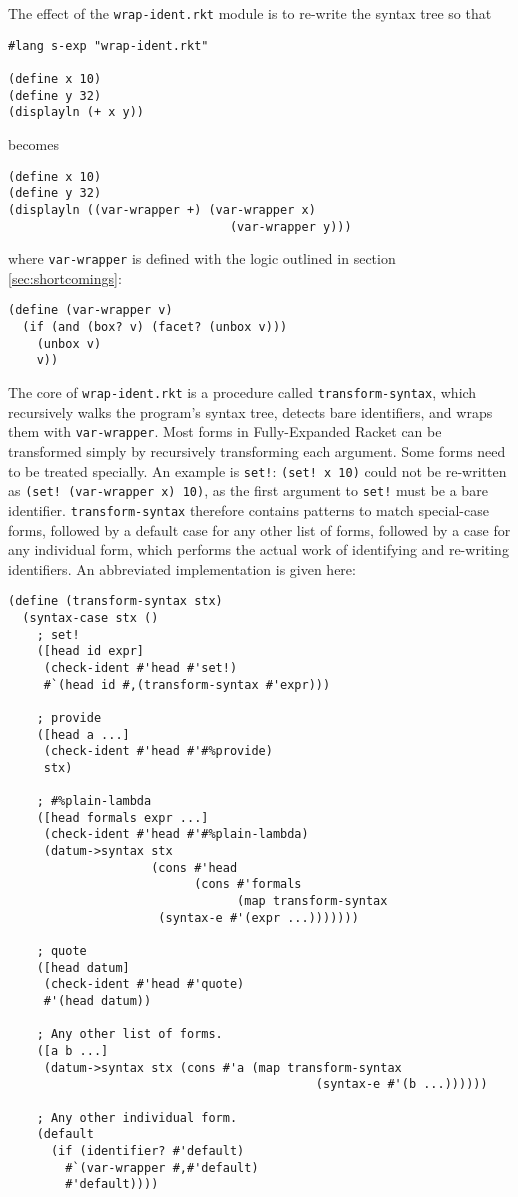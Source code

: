 \documentclass{article}
\begin{document}
The effect of the \texttt{wrap-ident.rkt} module is to re-write the syntax tree so that

\begin{lstlisting}
#lang s-exp "wrap-ident.rkt"

(define x 10)
(define y 32)
(displayln (+ x y))
\end{lstlisting}

\noindent becomes

\begin{lstlisting}
(define x 10)
(define y 32)
(displayln ((var-wrapper +) (var-wrapper x)
                               (var-wrapper y)))
\end{lstlisting}

\noindent where \texttt{var-wrapper} is defined with the logic outlined in section \ref{sec:shortcomings}:

\begin{lstlisting}
(define (var-wrapper v)
  (if (and (box? v) (facet? (unbox v)))
    (unbox v)
    v))
\end{lstlisting}

The core of \texttt{wrap-ident.rkt} is a procedure called \texttt{transform-syntax}, which recursively walks the program's syntax tree, detects bare identifiers, and wraps them with \texttt{var-wrapper}. Most forms in Fully-Expanded Racket can be transformed simply by recursively transforming each argument. Some forms need to be treated specially. An example is \texttt{set!}: \texttt{(set! x 10)} could not be re-written as \texttt{(set! (var-wrapper x) 10)}, as the first argument to \texttt{set!} must be a bare identifier. \texttt{transform-syntax} therefore contains patterns to match special-case forms, followed by a default case for any other list of forms, followed by a case for any individual form, which performs the actual work of identifying and re-writing identifiers. An abbreviated implementation is given here:

\begin{lstlisting}
(define (transform-syntax stx)
  (syntax-case stx ()
    ; set!
    ([head id expr]
     (check-ident #'head #'set!)
     #`(head id #,(transform-syntax #'expr)))

    ; provide
    ([head a ...]
     (check-ident #'head #'#%provide)
     stx)

    ; #%plain-lambda
    ([head formals expr ...]
     (check-ident #'head #'#%plain-lambda)
     (datum->syntax stx
                    (cons #'head
                          (cons #'formals
                                (map transform-syntax
				     (syntax-e #'(expr ...)))))))

    ; quote
    ([head datum]
     (check-ident #'head #'quote)
     #'(head datum))

    ; Any other list of forms.
    ([a b ...]
     (datum->syntax stx (cons #'a (map transform-syntax
                                           (syntax-e #'(b ...))))))

    ; Any other individual form.
    (default
      (if (identifier? #'default)
        #`(var-wrapper #,#'default)
        #'default))))
\end{lstlisting}
\end{document}
